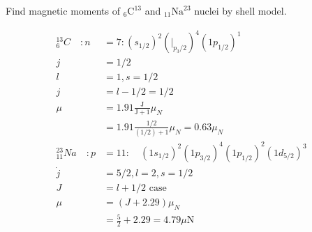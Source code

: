 \begin{exercise}
	Find magnetic moments of ${ }_{6} \mathrm{C}^{\mathrm{13}}$ and ${ }_{11}\mathrm{Na}^{\mathrm{23}}$ nuclei by shell model.
\end{exercise}
\begin{answer}
	\begin{align*}
	{ }^{13}_{6}C\quad :n&=7:\left(s_{1 / 2}\right)^{2}\left(\left.\right|_{p_{3} / 2}\right)^{4}\left(1 p_{1 / 2}\right)^{1}\\
	j&=1 / 2 \\
	l&=1, s=1 / 2\\
	j&=l-1 / 2=1 / 2\\
	\mu&=1.91 \frac{\mathrm{J}}{\mathrm{J}+1} \mu_{N}\\
	&=1.91 \frac{1 / 2}{(1 / 2)+1} \mu_{N}=0.63 \mu_{N}\\
	{}^{23}_{11}Na\quad  : p&=11: \quad\left(1 s_{1 / 2}\right)^{2}\left(1 p_{3 / 2}\right)^{4}\left(1 p_{1 / 2}\right)^{2}\left(1 d_{5 / 2}\right)^{3}\\
	\dot{j}&=5 / 2, l=2, s=1 / 2\\
	J&=l+1 / 2 \text { case }\\
	\mu&=(J+2.29) \mu_{N}\\
	&=\frac{5}{2}+2.29=4.79 \mu \mathrm{N}
	\end{align*}
\end{answer}
